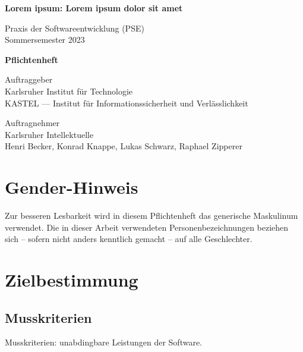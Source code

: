 \documentclass[parskip=full]{scrartcl}
\begin{document}
\begin{titlepage}
    \begin{center}
        \begin{Huge}
            {\textbf{Lorem ipsum: Lorem ipsum dolor sit amet}}
        \end{Huge}
        \vspace{12px}

        Praxis der Softwareentwicklung (PSE)\\
        Sommersemester 2023\\
        \vspace{170px}
        
        \begin{huge}
            {\textbf{Pflichtenheft}}
        \end{huge}
        \vspace{12px}

        Auftraggeber\\
        Karlsruher Institut für Technologie\\
        KASTEL — Institut für Informationssicherheit und Verlässlichkeit\\
        \vspace{310px}

        Auftragnehmer\\
        Karlsruher Intellektuelle\\
        Henri Becker, Konrad Knappe, Lukas Schwarz, Raphael Zipperer\\
    \end{center}
\end{titlepage}

\tableofcontents

\vspace{32px}
\section*{Gender-Hinweis}
Zur besseren Lesbarkeit wird in diesem Pflichtenheft das generische Maskulinum verwendet. Die in dieser Arbeit verwendeten Personenbezeichnungen beziehen sich – sofern nicht anders kenntlich gemacht – auf alle Geschlechter.
\newpage


\section{Zielbestimmung}

\subsection{Musskriterien}
Musskriterien: unabdingbare Leistungen der Software.
\end{document}
